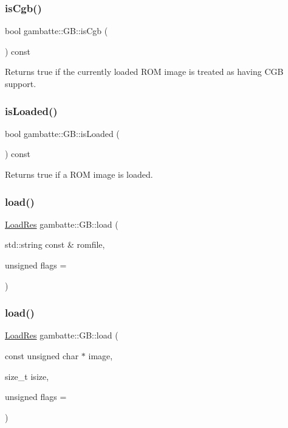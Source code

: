 \subsubsection{\texorpdfstring{is\+Cgb()}{isCgb()}}
{\footnotesize\ttfamily bool gambatte\+::\+G\+B\+::is\+Cgb (\begin{DoxyParamCaption}{ }\end{DoxyParamCaption}) const}

Returns true if the currently loaded R\+OM image is treated as having C\+GB support. \mbox{\label{classgambatte_1_1GB_ae7b16fcdf62d8dcd3c17cc1c5cad223e}} 
\subsubsection{\texorpdfstring{is\+Loaded()}{isLoaded()}}
{\footnotesize\ttfamily bool gambatte\+::\+G\+B\+::is\+Loaded (\begin{DoxyParamCaption}{ }\end{DoxyParamCaption}) const}

Returns true if a R\+OM image is loaded. \mbox{\label{classgambatte_1_1GB_a3eb7cf83b1634dacc796971760b31fa2}} 
\subsubsection{\texorpdfstring{load()}{load()}\hspace{0.1cm}{\footnotesize\ttfamily [1/2]}}
{\footnotesize\ttfamily \hyperlink{namespacegambatte_a42606f494711d2e2870a5f5cdf69e468}{Load\+Res} gambatte\+::\+G\+B\+::load (\begin{DoxyParamCaption}\item[{std\+::string const \&}]{romfile,  }\item[{unsigned}]{flags = {} }\end{DoxyParamCaption})}

\mbox{\label{classgambatte_1_1GB_a4ee8c151c978541fe20a282bdcc68969}} 
\subsubsection{\texorpdfstring{load()}{load()}\hspace{0.1cm}{\footnotesize\ttfamily [2/2]}}
{\footnotesize\ttfamily \hyperlink{namespacegambatte_a42606f494711d2e2870a5f5cdf69e468}{Load\+Res} gambatte\+::\+G\+B\+::load (\begin{DoxyParamCaption}\item[{const unsigned char $\ast$}]{image,  }\item[{size\+\_\+t}]{isize,  }\item[{unsigned}]{flags = {} }\end{DoxyParamCaption})}

